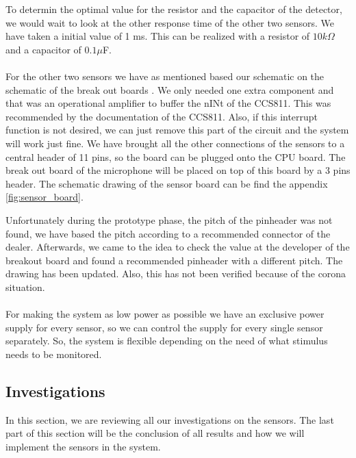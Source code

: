 \documentclass[11pt,a4paper]{article}
\begin{document}
To determin the optimal value for the resistor and the capacitor of the detector, we would wait to look at the other response time of the other two sensors. We have taken a initial value of 1 ms. This can be realized with a resistor of $ 10 k\Omega$ and a capacitor of $0.1 \mu$F.
\\ \\
For the other two sensors we have as mentioned based our schematic on the schematic of the break out boards \cite{bib:AMG8833_schematic} \cite{bib:CCS811_schematic} . We only needed one extra component and that was an operational amplifier to buffer the nINt of the CCS811. This was recommended by the documentation of the CCS811. Also, if this interrupt function is not desired, we can just remove this part of the circuit and the system will work just fine. We have brought all the other connections of the sensors to a central header of 11 pins, so the board can be plugged onto the CPU board. The break out board of the microphone will be placed on top of this board by a 3 pins header.  The schematic drawing of the sensor board can be find the appendix \ref{fig:sensor_board}.

Unfortunately during the prototype phase, the pitch of the pinheader was not found, we have based the pitch according to a recommended connector of the dealer. Afterwards, we came to the idea to check the value at the developer of the breakout board and found a recommended pinheader with a different pitch. The drawing has been updated. Also, this has not been verified because of the corona situation.
\\ \\
For making the system as low power as possible we have an exclusive power supply for every sensor, so we can control the supply for every single sensor separately.
So, the system is flexible depending on the need of what stimulus needs to be monitored.

\subsection{Investigations}
In this section, we are reviewing all our investigations on the sensors. The last part of this section will be the conclusion of all results and how we will implement the sensors in the system.
\end{document}
